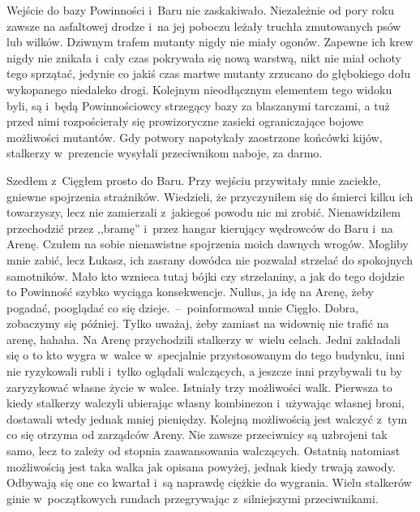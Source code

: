 \documentclass[../MAIN.tex]{subfiles}
\begin{document}
Wejście do bazy Powinności i~Baru nie zaskakiwało. Niezależnie
od pory roku zawsze na asfaltowej drodze i~na jej poboczu
leżały truchła zmutowanych psów lub wilków. Dziwnym trafem
mutanty nigdy nie miały ogonów. Zapewne ich krew nigdy nie
znikała i~cały czas pokrywała się nową warstwą, nikt nie miał
ochoty tego sprzątać, jedynie co jakiś czas martwe mutanty
zrzucano do głębokiego dołu wykopanego niedaleko drogi.
Kolejnym nieodłącznym elementem tego widoku byli, są i~będą
Powinnościowcy strzegący bazy za blaszanymi tarczami, a tuż
przed nimi rozpościerały się prowizoryczne zasieki
ograniczające bojowe możliwości mutantów. Gdy potwory
napotykały zaostrzone końcówki kijów, stalkerzy w~prezencie
wysyłali przeciwnikom naboje, za darmo.

Szedłem z~Cięgłem prosto do Baru. Przy wejściu przywitały mnie
zaciekłe, gniewne spojrzenia strażników. Wiedzieli, że
przyczyniłem się do śmierci kilku ich towarzyszy, lecz nie
zamierzali z~jakiegoś powodu nic mi zrobić. Nienawidziłem
przechodzić przez ,,bramę'' i~przez hangar kierujący wędrowców
do
Baru i~na Arenę. Czułem na sobie nienawistne spojrzenia moich
dawnych wrogów. Mogliby mnie zabić, lecz Łukasz, ich zasrany
dowódca nie pozwalał strzelać do spokojnych samotników. Mało
kto wznieca tutaj bójki czy strzelaniny, a jak do tego dojdzie
to Powinność szybko wyciąga konsekwencje.
%
\sx Nullus, ja idę na Arenę, żeby pogadać, pooglądać co się
dzieje.~--~poinformował mnie Cięgło.
\xx Dobra, zobaczymy się później. Tylko uważaj, żeby zamiast na
widownię nie trafić na arenę, hahaha.
\qd
Na Arenę przychodzili stalkerzy w~wielu celach. Jedni zakładali
się o to kto wygra w~walce w~specjalnie przystosowanym do tego
budynku, inni nie ryzykowali rubli i~tylko oglądali walczących,
a jeszcze inni przybywali tu by zaryzykować własne życie w
walce. Istniały trzy możliwości walk. Pierwsza to kiedy
stalkerzy walczyli ubierając własny kombinezon i~używając
własnej broni, dostawali wtedy jednak mniej pieniędzy. Kolejną
możliwością jest walczyć z~tym co się otrzyma od zarządców
Areny. Nie zawsze przeciwnicy są uzbrojeni tak samo, lecz to
zależy od stopnia zaawansowania walczących. Ostatnią natomiast
możliwością jest taka walka jak opisana powyżej, jednak kiedy
trwają zawody. Odbywają się one co kwartał i~są naprawdę
ciężkie do wygrania. Wielu stalkerów ginie w~początkowych
rundach przegrywając z~silniejszymi przeciwnikami.
\end{document}
